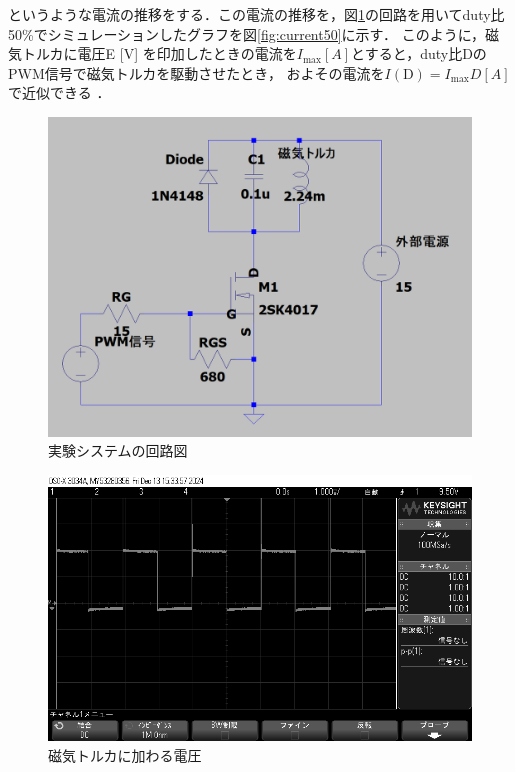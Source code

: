 というような電流の推移をする．この電流の推移を，図\ref{fig:cirkit}の回路を用いてduty比50\%でシミュレーションしたグラフを図\ref{fig:current50}に示す．
このように，磁気トルカに電圧E [V] を印加したときの電流を$I_\mathrm{max} [A]$とすると，duty比DのPWM信号で磁気トルカを駆動させたとき，
およその電流を$I(\mathrm{D})=I_\mathrm{max}D [A]$で近似できる                   ． 

\begin{figure}[H]
	\centering
		\includegraphics[scale=0.3]{./figure/回路図.png}
		\caption{実験システムの回路図}
		\label{fig:cirkit}
\end{figure}

\begin{figure}[H]
	\centering
		\includegraphics[scale=0.3]{./figure/scope_11.png}
		\caption{磁気トルカに加わる電圧}
		\label{fig:osiro2}
\end{figure}

